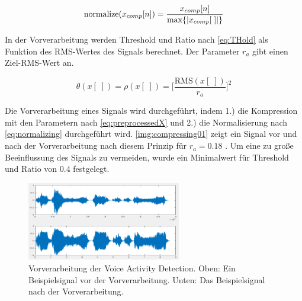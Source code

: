 \begin{equation}
\text{normalize}(x_{comp}[n]) = \frac{x_{comp}[n]}{\operatorname*{max}\{|x_{comp}[\;]|\}}
\label{eq:normalizing}
\end{equation}

In der Vorverarbeitung werden Threshold und Ratio nach \autoref{eq:THold} als Funktion des RMS-Wertes des Signals berechnet. Der Parameter $r_a$ gibt einen Ziel-RMS-Wert an.

\begin{equation}
\theta(x[\;]) = \rho(x[\;])  = \bigg[\frac{\text{RMS}(x[\;])}{r_a}\bigg]^{2}
\label{eq:THold}
\end{equation}

Die Vorverarbeitung eines Signals wird durchgeführt, indem 1.) die Kompression mit den Parametern nach \autoref{eq:preprocessedX} und 2.) die Normalisierung nach \autoref{eq:normalizing} durchgeführt wird. \autoref{img:compressing01} zeigt ein Signal vor und nach der Vorverarbeitung nach diesem Prinzip für $r_a = 0.18$ . Um eine zu große Beeinflussung des Signals zu vermeiden, wurde ein Minimalwert für Threshold und Ratio von $0.4$ festgelegt.

\begin{figure}[h]
	\centering
	\includegraphics[width=0.6\textwidth]{bilder/compressing01.png}
	\caption[Vorverarbeitung der Voice Activity Detection]{Vorverarbeitung der Voice Activity Detection. Oben: Ein Beispielsignal vor der Vorverarbeitung. Unten: Das Beispielsignal nach der Vorverarbeitung.}
	\label{img:compressing01}
\end{figure}

